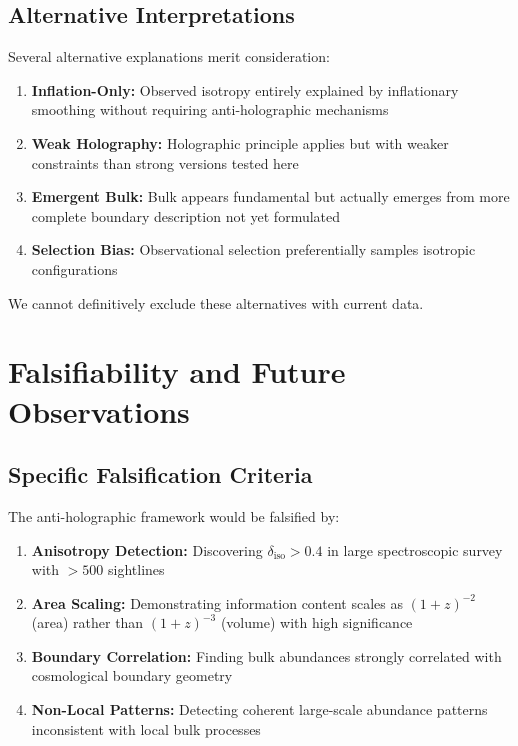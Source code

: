 \documentclass[twocolumn,aps,prd,superscriptaddress,nofootinbib]{revtex4-2}
\begin{document}
\subsection{Alternative Interpretations}

Several alternative explanations merit consideration:

\begin{enumerate}
    \item \textbf{Inflation-Only:} Observed isotropy entirely explained by inflationary smoothing without requiring anti-holographic mechanisms
    
    \item \textbf{Weak Holography:} Holographic principle applies but with weaker constraints than strong versions tested here
    
    \item \textbf{Emergent Bulk:} Bulk appears fundamental but actually emerges from more complete boundary description not yet formulated
    
    \item \textbf{Selection Bias:} Observational selection preferentially samples isotropic configurations
\end{enumerate}

We cannot definitively exclude these alternatives with current data.

\section{Falsifiability and Future Observations}

\subsection{Specific Falsification Criteria}

The anti-holographic framework would be falsified by:

\begin{enumerate}
    \item \textbf{Anisotropy Detection:} Discovering $\delta_{\text{iso}} > 0.4$ in large spectroscopic survey with $> 500$ sightlines
    
    \item \textbf{Area Scaling:} Demonstrating information content scales as $(1+z)^{-2}$ (area) rather than $(1+z)^{-3}$ (volume) with high significance
    
    \item \textbf{Boundary Correlation:} Finding bulk abundances strongly correlated with cosmological boundary geometry
    
    \item \textbf{Non-Local Patterns:} Detecting coherent large-scale abundance patterns inconsistent with local bulk processes
\end{enumerate}
\end{document}
